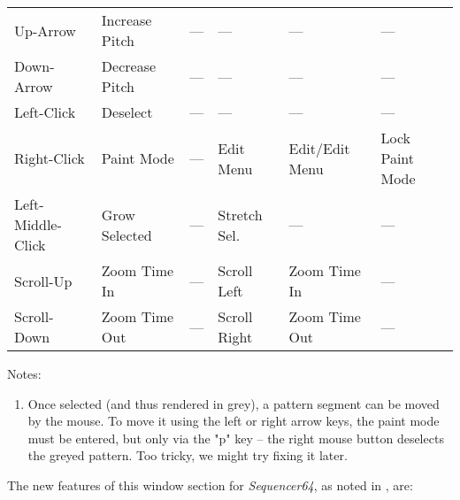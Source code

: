 \begin{table}
\begin{tabular}{l l l l l l}
         Up-Arrow          & Increase Pitch  & ---                &
            ---            & ---             & ---                \\
         Down-Arrow        & Decrease Pitch  & ---                &
            ---            & ---             & ---                \\
         Left-Click        & Deselect        & ---                &
            ---            & ---             & ---                \\
         Right-Click       & Paint Mode      & ---                &
            Edit Menu      & Edit/Edit Menu  & Lock Paint Mode    \\
         Left-Middle-Click & Grow Selected   & ---                &
            Stretch Sel.   & ---             & ---                \\
         Scroll-Up         & Zoom Time In    & ---                &
            Scroll Left    & Zoom Time In    & ---                \\
         Scroll-Down       & Zoom Time Out   & ---                &
            Scroll Right   & Zoom Time Out   & ---                \\
      \end{tabular}
   \end{table}

   Notes:

      \begin{enumerate}
         \item Once selected (and thus rendered in grey), a pattern segment
            can be moved by the mouse.  To move it using the left or right
            arrow keys, the paint mode must be entered, but only via the "p"
            key -- the right mouse button deselects the greyed pattern.
            Too tricky, we might try fixing it later.
      \end{enumerate}

   The new features of this window section for \textsl{Sequencer64},
   as noted in
   , are:

